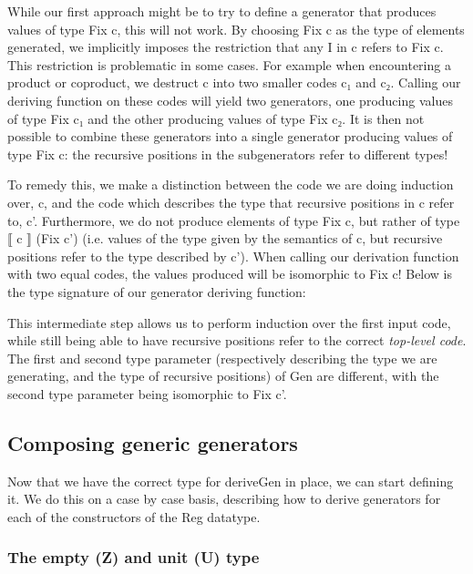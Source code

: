 \documentclass[a4paper,msc,twosized=semi]{uustthesis}
\let\oldemph\emph
\renewcommand\emph[1]{{\large\oldemph{#1}}}
\newcommand{\agda}[1]{{\agdafontinline\color{agdacolor}#1}}
\newcommand{\includeagda}[2]{\vspace*{-0.25cm}\begin{center}{\fontsize{12}{14}\agdafont\ExecuteMetaData[../src/chap0#1/latex/code.tex]{#2}}\end{center}\vspace*{-0.25cm}}
\begin{document}
  While our first approach might be to try to define a generator that produces values 
  of type \agda{Fix c}, this will not work. By choosing \agda{Fix c} as the type of elements 
  generated, we implicitly imposes the restriction that any \agda{I} in \agda{c} refers to \agda{Fix 
  c}. This restriction is problematic in some cases. For example when encountering a 
  product or coproduct, we destruct \agda{c} into two smaller codes \agda{c₁} and \agda{c₂}. Calling 
  our deriving function on these codes will yield two generators, one producing values 
  of type \agda{Fix c₁} and the other producing values of type \agda{Fix c₂}. It is then not 
  possible to combine these generators into a single generator producing values of 
  type \agda{Fix c}: the recursive positions in the subgenerators refer to different types!

  To remedy this, we make a distinction between the code we are doing induction over, \agda{
  c}, and the code which describes the type that recursive positions in \agda{c} refer to, \agda{
  c'}. Furthermore, we do not produce elements of type \agda{Fix c}, but rather of type \agda{⟦ 
  c ⟧ (Fix c')} (i.e. values of the type given by the semantics of \agda{c}, but recursive 
  positions refer to the type described by \agda{c'}). When calling our derivation function 
  with two equal codes, the values produced will be isomorphic to \agda{Fix c}! Below is 
  the type signature of our generator deriving function: 

\includeagda{5}{genericgen2}

  This intermediate step allows us to perform induction over the first input code, 
  while still being able to have recursive positions refer to the correct \emph
  {top-level code}. The first and second type parameter (respectively describing the 
  type we are generating, and the type of recursive positions) of \agda{Gen} are different, 
  with the second type parameter being isomorphic to \agda{Fix c'}.  

\subsection{Composing generic generators}

  Now that we have the correct type for \agda{deriveGen} in place, we can start defining 
  it. We do this on a case by case basis, describing how to derive generators for each 
  of the constructors of the \agda{Reg} datatype. 

\subsubsection{The empty (Z) and unit (U) type}
\end{document}
